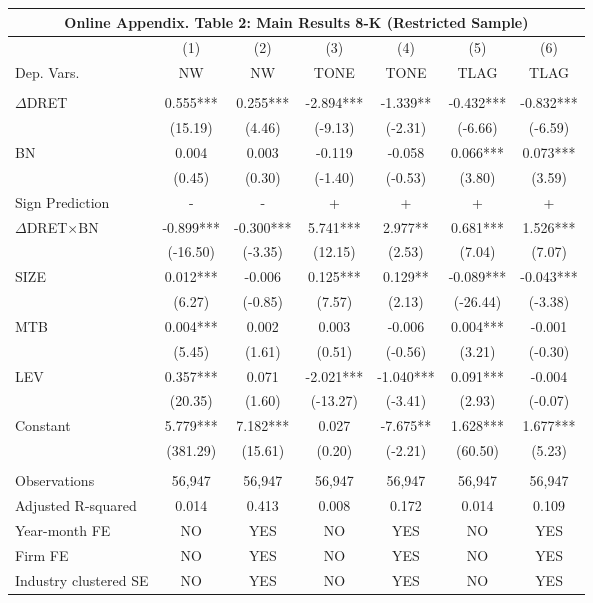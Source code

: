 \begin{table}[htbp] \label{oat2}
  \centering
    \begin{tabular}{lcccccc}
    \multicolumn{7}{c}{\textbf{Online Appendix. Table 2: Main Results 8-K (Restricted Sample)}} \\
    \midrule
      & (1) & (2) & (3) & (4) & (5) & (6) \\
    Dep. Vars. & NW & NW & TONE & TONE & TLAG & TLAG \\
    \midrule
      &   &   &   &   &   &  \\
    $\Delta$DRET & 0.555*** & 0.255*** & -2.894*** & -1.339** & -0.432*** & -0.832*** \\
    & (15.19) & (4.46) & (-9.13) & (-2.31) & (-6.66) & (-6.59) \\
    BN & 0.004 & 0.003 & -0.119 & -0.058 & 0.066*** & 0.073*** \\
    & (0.45) & (0.30) & (-1.40) & (-0.53) & (3.80) & (3.59) \\
    \rowcolor[rgb]{ .933,  .925,  .882} Sign Prediction & - & - & + & + & + & + \\
    \rowcolor[rgb]{ .933,  .925,  .882} $\Delta$DRET$\times$BN & -0.899*** & -0.300*** & 5.741*** & 2.977** & 0.681*** & 1.526*** \\
    \rowcolor[rgb]{ .933,  .925,  .882}   & (-16.50) & (-3.35) & (12.15) & (2.53) & (7.04) & (7.07) \\
    SIZE & 0.012*** & -0.006 & 0.125*** & 0.129** & -0.089*** & -0.043*** \\
    & (6.27) & (-0.85) & (7.57) & (2.13) & (-26.44) & (-3.38) \\
    MTB & 0.004*** & 0.002 & 0.003 & -0.006 & 0.004*** & -0.001 \\
    & (5.45) & (1.61) & (0.51) & (-0.56) & (3.21) & (-0.30) \\
    LEV & 0.357*** & 0.071 & -2.021*** & -1.040*** & 0.091*** & -0.004 \\
    & (20.35) & (1.60) & (-13.27) & (-3.41) & (2.93) & (-0.07) \\
    Constant & 5.779*** & 7.182*** & 0.027 & -7.675** & 1.628*** & 1.677*** \\
    & (381.29) & (15.61) & (0.20) & (-2.21) & (60.50) & (5.23) \\
    &   &   &   &   &   &  \\
    Observations & 56,947 & 56,947 & 56,947 & 56,947 & 56,947 & 56,947 \\
    Adjusted R-squared & 0.014 & 0.413 & 0.008 & 0.172 & 0.014 & 0.109 \\
    Year-month FE & NO & YES & NO & YES & NO & YES \\
    Firm FE & NO & YES & NO & YES & NO & YES \\
    Industry clustered SE & NO & YES & NO & YES & NO & YES \\
    \bottomrule
    \end{tabular}%
\end{table}%

